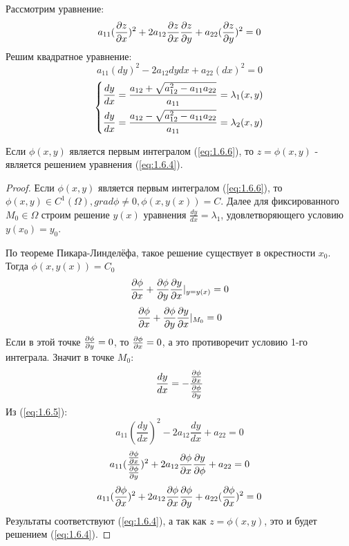 \documentclass[../main.tex]{subfiles}
\begin{document}
	Рассмотрим уравнение:
	\begin{equation}\label{eq:1.6.4}
		a_{11}(\frac{\partial z}{\partial x})^2+2a_{12}\frac{\partial z}{\partial x}\frac{\partial z}{\partial y}+a_{22}(\frac{\partial z}{\partial y})^2=0
	\end{equation}
	Решим квадратное уравнение:
	\begin{equation}\label{eq:1.6.5}
		a_{11}(dy)^2-2a_{12}dydx+a_{22}(dx)^2=0
	\end{equation}
	\begin{equation}\label{eq:1.6.6}
		\begin{dcases}
			\frac{dy}{dx} = \frac{a_{12}+\sqrt{a_{12}^2-a_{11}a_{22}}}{a_{11}}=\lambda_1(x,y) \\
			\frac{dy}{dx} = \frac{a_{12}-\sqrt{a_{12}^2-a_{11}a_{22}}}{a_{11}}=\lambda_2(x,y)
		\end{dcases}
	\end{equation}
	\begin{theorem}
		\label{th:1.6.1}
		Если $\phi(x,y)$ является первым интегралом (\ref{eq:1.6.6}), то $z=\phi(x,y)$ - является решением уравнения (\ref{eq:1.6.4}).
	\end{theorem}
	\begin{proof}
	\par Если $\phi(x,y)$ является первым интегралом (\ref{eq:1.6.6}), то $\phi(x,y) \in C^1(\Omega), grad \phi \ne 0, \phi(x,y(x))=C$. Далее для фиксированного $M_0\in\Omega$ строим решение $y(x)$ уравнения $\frac{dy}{dx}=\lambda_1$, удовлетворяющего условию $y(x_0)=y_0$.\\
	\par По теореме Пикара-Линделёфа, такое решение существует в окрестности $x_0$. Тогда $\phi(x,y(x))=C_0$
	$$\frac{\partial \phi}{\partial x}+\frac{\partial \phi}{\partial y}\frac{\partial y}{\partial x}|_{y=y(x)}=0$$
	$$\frac{\partial \phi}{\partial x}+\frac{\partial \phi}{\partial y}\frac{\partial y}{\partial x}|_{M_0}=0$$
	Если в этой точке $\frac{\partial \phi}{\partial y}=0$, то $\frac{\partial \phi}{\partial x}=0$, а это противоречит условию 1-го интеграла. Значит в точке $M_0$:
	$$\frac{dy}{dx}=-\frac{\frac{\partial \phi}{\partial x}}{\frac{\partial \phi}{\partial y}}$$
	Из (\ref{eq:1.6.5}):
	$$ a_{11}(\frac{dy}{dx})^2-2a_{12}\frac{dy}{dx}+a_{22}=0$$
	$$ a_{11}(\frac{\frac{\partial \phi}{\partial x}}{\frac{\partial \phi}{\partial y}})^2+2a_{12}\frac{\partial \phi}{\partial x}\frac{\partial y}{\partial \phi}+a_{22}=0$$
	$$ a_{11}(\frac{\partial \phi}{\partial x})^2+2a_{12}\frac{\partial \phi}{\partial x}\frac{\partial \phi}{\partial y}+a_{22}(\frac{\partial \phi}{\partial x})^2=0$$
	Результаты соответствуют (\ref{eq:1.6.4}), а так как $z = \phi(x,y)$, это и будет решением (\ref{eq:1.6.4}).
	\end{proof}
	
\end{document}
